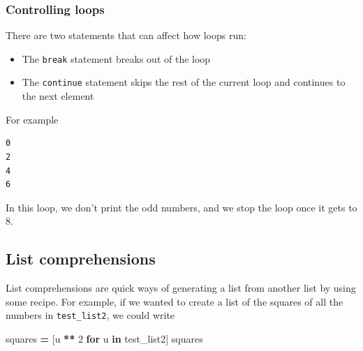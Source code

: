 \documentclass[
  letterpaper,
]{scrbook}
\newenvironment{Shaded}{\begin{snugshade}}{\end{snugshade}}
\newcommand{\BuiltInTok}[1]{#1}
\newcommand{\CommentTok}[1]{\textcolor[rgb]{0.56,0.35,0.01}{\textit{#1}}}
\newcommand{\ControlFlowTok}[1]{\textcolor[rgb]{0.13,0.29,0.53}{\textbf{#1}}}
\newcommand{\DecValTok}[1]{\textcolor[rgb]{0.00,0.00,0.81}{#1}}
\newcommand{\KeywordTok}[1]{\textcolor[rgb]{0.13,0.29,0.53}{\textbf{#1}}}
\newcommand{\NormalTok}[1]{#1}
\newcommand{\OperatorTok}[1]{\textcolor[rgb]{0.81,0.36,0.00}{\textbf{#1}}}
\providecommand{\tightlist}{%
  \setlength{\itemsep}{0pt}\setlength{\parskip}{0pt}}
\begin{document}
\hypertarget{controlling-loops}{%
\subsubsection{Controlling loops}\label{controlling-loops}}

There are two statements that can affect how loops run:

\begin{itemize}
\tightlist
\item
  The \texttt{break} statement breaks out of the loop
\item
  The \texttt{continue} statement skips the rest of the current loop and continues to the next element
\end{itemize}

For example

\begin{Shaded}
\end{Shaded}

\begin{verbatim}
0
2
4
6
\end{verbatim}

In this loop, we don't print the odd numbers, and we stop the loop once it gets to 8.

\hypertarget{list-comprehensions}{%
\subsection{List comprehensions}\label{list-comprehensions}}

List comprehensions are quick ways of generating a list from another list by using some recipe. For example, if we wanted to create a list of the squares of all the numbers in \texttt{test\_list2}, we could write

\begin{Shaded}
\begin{Highlighting}[]
\NormalTok{squares }\OperatorTok{=}\NormalTok{ [u }\OperatorTok{**} \DecValTok{2} \ControlFlowTok{for}\NormalTok{ u }\KeywordTok{in}\NormalTok{ test_list2]}
\NormalTok{squares}
\end{Highlighting}
\end{Shaded}
\end{document}
